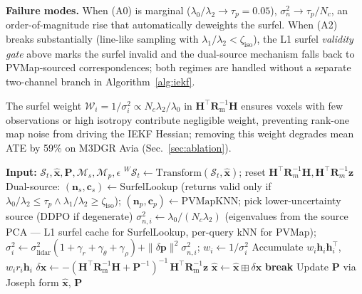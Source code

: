 \documentclass[conference]{IEEEtran}
\newcommand{\xhat}{\hat{\mathbf{x}}}
\newcommand{\bvec}[1]{\mathbf{#1}}
\begin{document}
\textbf{Failure modes.}
When (A0) is marginal ($\lambda_0/\lambda_2 \to \tau_p{=}0.05$),
$\sigma^2_n \to \tau_p/N_c$, an order-of-magnitude rise that
automatically deweights the surfel. When (A2) breaks substantially
(line-like sampling with $\lambda_1/\lambda_2 < \zeta_\mathrm{iso}$),
the L1 surfel \emph{validity gate} above marks the surfel invalid and
the dual-source mechanism falls back to PVMap-sourced correspondences;
both regimes are handled without a separate two-channel branch in
Algorithm~\ref{alg:iekf}.

The surfel weight $\mathcal{W}_i = 1/\sigma^2_i \propto N_c\lambda_2/\lambda_0$
in $\bvec{H}^\top\bvec{R}_\mathrm{m}^{-1}\bvec{H}$ ensures voxels with
few observations or high isotropy contribute negligible weight,
preventing rank-one map noise from driving the IEKF Hessian; removing
this weight degrades mean ATE by 59\% on M3DGR Avia
(Sec.~\ref{sec:ablation}).

\begin{algorithm}[t]
\small
\caption{IEKF update with surfel-derived noise}
\label{alg:iekf}
\begin{algorithmic}[1]
\STATE \textbf{Input:} $\mathcal{S}_t,\xhat,\bvec{P},\mathcal{M}_s,\mathcal{M}_p,\epsilon$
  \STATE ${}^W\mathcal{S}_t \leftarrow \text{Transform}(\mathcal{S}_t,\xhat)$;\;
         reset $\bvec{H}^\top\bvec{R}_m^{-1}\bvec{H},\bvec{H}^\top\bvec{R}_m^{-1}\bvec{z}$
  \FOR{each $\bvec{p}_i \in {}^W\mathcal{S}_t$}
    \STATE Dual-source: $(\bvec{n}_s,\bvec{c}_s){\gets}\mathrm{SurfelLookup}$ (returns valid only if
           $\lambda_0/\lambda_2{\le}\tau_p\wedge\lambda_1/\lambda_2{\ge}\zeta_\mathrm{iso}$);\;
           $(\bvec{n}_p,\bvec{c}_p){\gets}\mathrm{PVMapKNN}$;\;
           pick lower-uncertainty source (DDPO if degenerate)
    \STATE $\sigma^2_{n,i}{\gets}\lambda_0/(N_c\lambda_2)$
           (eigenvalues from the source PCA — L1 surfel cache for
           SurfelLookup, per-query kNN for PVMap);\;
           $\sigma^2_i{\gets}\sigma^2_\mathrm{lidar}(1{+}\gamma_r{+}\gamma_\theta{+}\gamma_\rho){+}\|\delta\bvec{p}\|^2\sigma^2_{n,i}$;\;
           $w_i{\gets}1/\sigma^2_i$
    \STATE Accumulate $w_i\bvec{h}_i\bvec{h}_i^\top$, $w_i r_i\bvec{h}_i$
  \ENDFOR
  \STATE $\delta\bvec{x} \leftarrow -(\bvec{H}^\top\bvec{R}_\mathrm{m}^{-1}\bvec{H} + \bvec{P}^{-1})^{-1}\,\bvec{H}^\top\bvec{R}_\mathrm{m}^{-1}\bvec{z}$
  \STATE $\xhat \leftarrow \xhat \boxplus \delta\bvec{x}$
  \IF{$\|\delta\bvec{x}\| < \epsilon$}
    \STATE \textbf{break}
  \ENDIF
\ENDFOR
\STATE Update $\bvec{P}$ via Joseph form
\RETURN $\xhat$, $\bvec{P}$
\end{algorithmic}
\end{algorithm}
\end{document}
